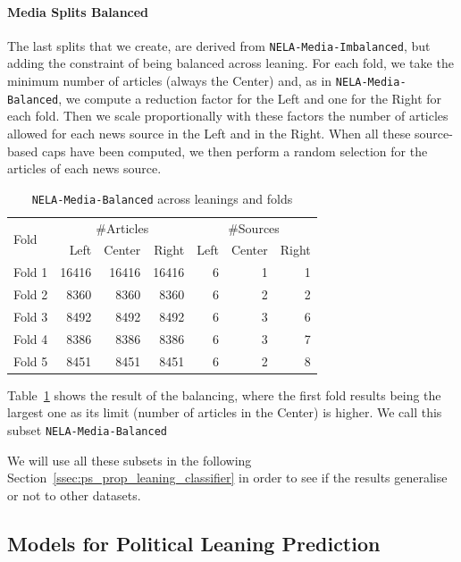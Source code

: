 \paragraph{Media Splits Balanced}

The last splits that we create, are derived from \texttt{NELA-Media-Imbalanced}, but adding the constraint of being balanced across leaning.
For each fold, we take the minimum number of articles (always the Center) and, as in \texttt{NELA-Media-Balanced}, we compute a reduction factor for the Left and one for the Right for each fold. Then we scale proportionally with these factors the number of articles allowed for each news source in the Left and in the Right. When all these source-based caps have been computed, we then perform a random selection for the articles of each news source.  

\begin{table}[!htbp]
    \centering
    \begin{tabular}{l|rrr|rrr}
        \multirow{2}{*}{Fold} & \multicolumn{3}{c}{\#Articles} & \multicolumn{3}{c}{\#Sources} \\
         & Left & Center & Right & Left & Center & Right \\
        \hline
        Fold 1 & 16416 & 16416 & 16416 & 6 & 1 & 1 \\
        Fold 2 & 8360 & 8360 & 8360 & 6 & 2 & 2 \\
        Fold 3 & 8492 & 8492 & 8492 & 6 & 3 & 6 \\
        Fold 4 & 8386 & 8386 & 8386 & 6 & 3 & 7 \\
        Fold 5 & 8451 & 8451 & 8451 & 6 & 2 & 8 \\
    \end{tabular}
    \caption{\texttt{NELA-Media-Balanced} across leanings and folds}
    \label{tab:nela_media_balanced}
\end{table}

Table~\ref{tab:nela_media_balanced} shows the result of the balancing, where the first fold results being the largest one as its limit (number of articles in the Center) is higher.
We call this subset \texttt{NELA-Media-Balanced}

We will use all these subsets in the following Section~\ref{ssec:ps_prop_leaning_classifier} in order to see if the results generalise or not to other datasets.


\subsection{\statusorange Models for Political Leaning Prediction}
\label{ssec:ps_leaning_models}

